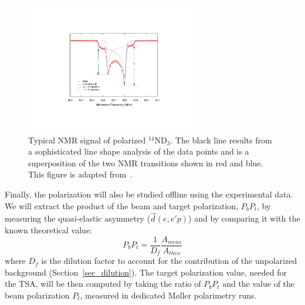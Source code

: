 \begin{figure}
\begin{center}
\includegraphics[width=3in]{Stache_NMR.pdf}
\end{center}
\caption[Typical ${}^{14}$ND$_3$ NMR signal]
{Typical NMR signal of polarized ${}^{14}$ND$_3$.  The black line results from a sophisticated line shape 
analysis of the data points and is a superposition of the two NMR transitions shown in red and blue.
This figure is adapted from~\cite{Kwaltine2013}.}
\label{NMR}
\end{figure}

Finally, the polarization will also be studied offline using the experimental data. We will extract the product of the beam and target polarization, $P_b P_t$, by measuring the quasi-elastic asymmetry ($\vec{d}(e,e'p)$) and by comparing it with the known theoretical value:
\begin{equation}
  P_b P_t=\frac{1}{D_f}\frac{A_{meas}}{A_{theo}}
\end{equation}
where $D_f$ is the dilution factor to account for the contribution of the unpolarized background (Section~\ref{sec_dilution}).
The target polarization value, needed for the TSA, will be then computed by taking the ratio of $P_bP_t$ and  the value of the beam polarization $P_t$, measured in dedicated M{\o}ller polarimetry runs. 

